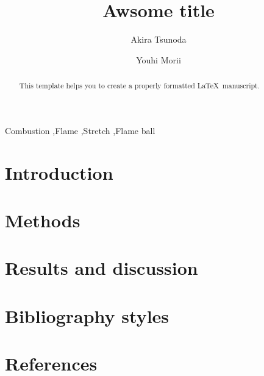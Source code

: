 \documentclass[twocolumn,10pt]{elsarticle}
\begin{document}
\begin{frontmatter}

\title{Awsome title}

\author[IFS, SoE]{Akira Tsunoda}

\author[IFS]{Youhi Morii}

\address[IFS]{Institue of Fluid Science, Tohoku University,\\ 2-1-1 Katahira, Aoba-ku, Sendai, Miyagi, 9808577 Japan}
\address[SoE]{School of Engineering, Tohoku University,\\ 6-6 Aoba, Aramaki, Aoba-ku, Sendai, Miyagi, 9808579 Japan}

\begin{abstract}
This template helps you to create a properly formatted \LaTeX\ manuscript.
\end{abstract}

\begin{keyword}
Combustion \sep Flame \sep Stretch \sep Flame ball
\end{keyword}

\end{frontmatter}

\linenumbers
\twocolumn

\section{Introduction}

\section{Methods}

\section{Results and discussion}

\section{Bibliography styles}

\section*{References}

%
\end{document}
